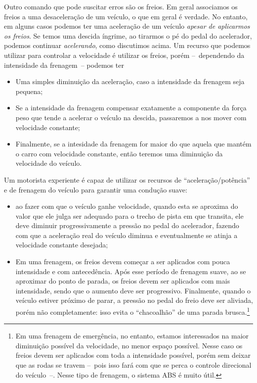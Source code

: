 Outro comando que pode suscitar erros são os freios. Em geral associamos os freios a uma desaceleração de um veículo, o que em geral é verdade. No entanto, em alguns casos podemos ter uma aceleração de um veículo \emph{apesar de aplicarmos os freios}. Se temos uma descida íngrime, ao tirarmos o pé do pedal do acelerador, podemos continuar \emph{acelerando}, como discutimos acima. Um recurso que podemos utilizar para controlar a velocidade é utilizar os freios, porém --~dependendo da intensidade da frenagem~-- podemos ter
\begin{itemize}
	\item Uma simples diminuição da aceleração, caso a intensidade da frenagem seja pequena;
	\item Se a intensidade da frenagem compensar exatamente a componente da força peso que tende a acelerar o veículo na descida, passaremos a nos mover com velocidade constante;
	\item Finalmente, se a intesidade da frenagem for maior do que aquela que mantém o carro com velocidade constante, então teremos uma diminuição da velocidade do veículo.
\end{itemize}

Um motorista experiente é capaz de utilizar os recursos de ``aceleração/potência'' e de frenagem do veículo para garantir uma condução suave:
\begin{itemize}
	\item ao fazer com que o veículo ganhe velocidade, quando esta se aproxima do valor que ele julga ser adequado para o trecho de pista em que transita, ele deve diminuir progressivamente a pressão no pedal do acelerador, fazendo com que a aceleração real do veículo diminua e eventualmente se atinja a velocidade constante desejada;
	\item Em uma frenagem, os freios devem começar a ser aplicados com pouca intensidade e com antecedência. Após esse período de frenagem suave, ao se aproximar do ponto de parada, os freios devem ser aplicados com mais intensidade, sendo que o aumento deve ser progressivo. Finalmente, quando o veículo estiver próximo de parar, a pressão no pedal do freio deve ser aliviada, porém não completamente: isso evita o ``chacoalhão'' de uma parada brusca.\footnote{Em uma frenagem de emergência, no entanto, estamos interessados na maior diminuição possível da velocidade, no menor espaço possível. Nesse caso os freios devem ser aplicados com toda a intensidade possível, porém sem deixar que as rodas se travem --~pois isso fará com que se perca o controle direcional do veículo~--. Nesse tipo de frenagem, o sistema ABS é muito útil.}
\end{itemize}

